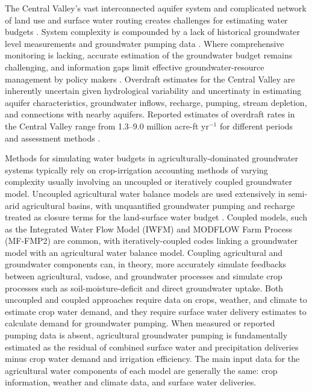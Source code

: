 The Central Valley’s vast interconnected aquifer system and complicated network of land use and surface water routing creates challenges for estimating water budgets \citep{hanak_managing_2011}. System complexity is compounded by a lack of historical groundwater level measurements and groundwater pumping data \citep{harter2008legal}. Where comprehensive monitoring is lacking, accurate estimation of the groundwater budget remains challenging, and information gaps limit effective groundwater-resource management by policy makers \citep{hanak_managing_2011}. Overdraft estimates for the Central Valley are inherently uncertain given hydrological variability and uncertinaty in estimating aquifer characteristics, groundwater inflows, recharge, pumping, stream depletion, and connections with nearby aquifers. Reported estimates of overdraft rates in the Central Valley range from 1.3--9.0 million acre-ft yr$^{-1}$ for different periods and assessment methods \citep{brush2013development,hanak2018replenishing,famiglietti2011satellites,faunt2009groundwater,xiao2017much}.

Methods for simulating water budgets in agriculturally-dominated groundwater systems typically rely on crop-irrigation accounting methods of varying complexity usually involving an uncoupled or iteratively coupled groundwater model. Uncoupled agricultural water balance models are used extensively in semi-arid agricultural basins, with unquantified groundwater pumping and recharge treated as closure terms for the land-surface water budget \citep{belitz1993numerical,ruud2004estimation}. Coupled models, such as the Integrated Water Flow Model (IWFM) \citep{dogrul2012integrated} and MODFLOW Farm Process (MF-FMP2) \citep{schmid2006user} are common, with iteratively-coupled codes linking a groundwater model with an agricultural water balance model. Coupling agricultural and groundwater components can, in theory, more accurately simulate feedbacks between agricultural, vadose, and groundwater processes and simulate crop processes such as soil-moisture-deficit and direct groundwater uptake. Both uncoupled and coupled approaches require data on crops, weather, and climate to estimate crop water demand, and they require surface water delivery estimates to calculate demand for groundwater pumping. When measured or reported pumping data is absent, agricultural groundwater pumping is fundamentally estimated as the residual of combined surface water and precipitation deliveries minus crop water demand and irrigation efficiency. The main input data for the agricultural water components of each model are generally the same: crop information, weather and climate data, and surface water deliveries. 

